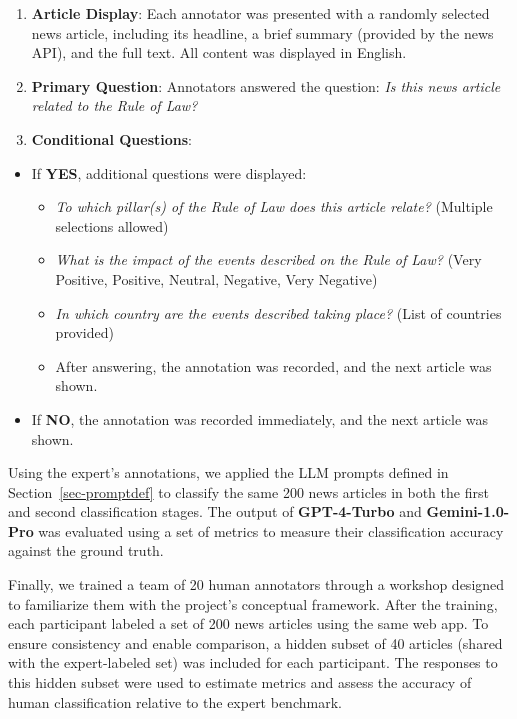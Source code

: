 \documentclass[
]{agujournal2019}
\providecommand{\tightlist}{%
  \setlength{\itemsep}{0pt}\setlength{\parskip}{0pt}}\usepackage{longtable,booktabs,array}
\begin{document}
\begin{enumerate}
\def\labelenumi{\arabic{enumi}.}
\tightlist
\item
  \textbf{Article Display}: Each annotator was presented with a randomly
  selected news article, including its headline, a brief summary
  (provided by the news API), and the full text. All content was
  displayed in English.
\item
  \textbf{Primary Question}: Annotators answered the question: \emph{Is
  this news article related to the Rule of Law?}
\item
  \textbf{Conditional Questions}:
\end{enumerate}

\begin{itemize}
\tightlist
\item
  If \textbf{YES}, additional questions were displayed:

  \begin{itemize}
  \tightlist
  \item
    \emph{To which pillar(s) of the Rule of Law does this article
    relate?} (Multiple selections allowed)
  \item
    \emph{What is the impact of the events described on the Rule of
    Law?} (Very Positive, Positive, Neutral, Negative, Very Negative)
  \item
    \emph{In which country are the events described taking place?} (List
    of countries provided)
  \item
    After answering, the annotation was recorded, and the next article
    was shown.
  \end{itemize}
\item
  If \textbf{NO}, the annotation was recorded immediately, and the next
  article was shown.
\end{itemize}

Using the expert's annotations, we applied the LLM prompts defined in
Section~\ref{sec-promptdef} to classify the same 200 news articles in
both the first and second classification stages. The output of
\textbf{GPT-4-Turbo} and \textbf{Gemini-1.0-Pro} was evaluated using a
set of metrics to measure their classification accuracy against the
ground truth.

Finally, we trained a team of 20 human annotators through a workshop
designed to familiarize them with the project's conceptual framework.
After the training, each participant labeled a set of 200 news articles
using the same web app. To ensure consistency and enable comparison, a
hidden subset of 40 articles (shared with the expert-labeled set) was
included for each participant. The responses to this hidden subset were
used to estimate metrics and assess the accuracy of human classification
relative to the expert benchmark.
\end{document}
